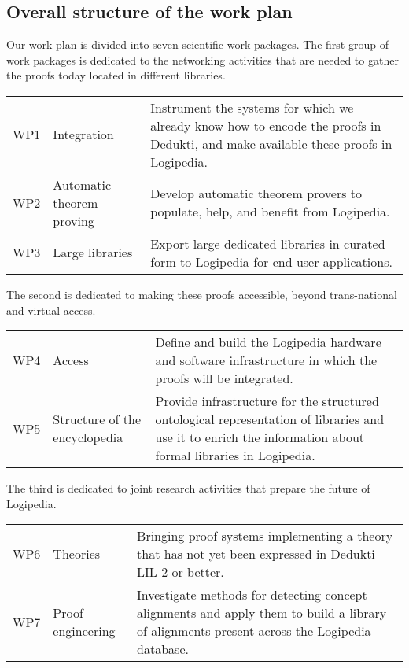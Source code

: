 \subsection{Overall structure of the work plan}

Our work plan is divided into seven scientific work packages.
The first group of work packages is dedicated to the networking
activities that are needed to gather the proofs today located in
different libraries.

\begin{longtable}{|p{}|p{}|p{}|}
\hline
\rowcolor{cyan}\multicolumn{3}{|l|}{\bf Networking activities:}\\
\hline
WP1
&
Integration
&
Instrument the systems for which we already know how to encode the
proofs in Dedukti, and make available these proofs in Logipedia.
\\
\hline
WP2
&
Automatic theorem proving
& 
Develop automatic theorem provers to populate,
help, and benefit from Logipedia.
\\
\hline
WP3
&
Large libraries
&
Export large dedicated libraries in curated form 
to Logipedia for end-user applications.
\\
\hline
\end{longtable}

The second is dedicated to making these proofs accessible, beyond
trans-national and virtual access.

\begin{longtable}{|p{}|p{}|p{}|}
\hline
\rowcolor{cyan}\multicolumn{3}{|l|}{\bf Trans-national and virtual access:}\\
\hline
WP4
&
Access
&
Define and build the Logipedia hardware and software infrastructure in
which the proofs will be integrated.
\\
\hline
WP5
&
Structure of the encyclopedia
&
Provide infrastructure for the structured ontological representation
of libraries and use it to enrich the information about formal
libraries in Logipedia.
\\
\hline
\end{longtable}

The third is dedicated to joint research activities that prepare
the future of Logipedia.

\begin{longtable}{|p{}|p{}|p{}|}
\hline
\rowcolor{cyan}\multicolumn{3}{|l|}{\bf Joint research activities:}\\
\hline
WP6
&
Theories
&
Bringing proof systems implementing a theory 
that has not yet been expressed in Dedukti LIL 2 or better.
\\
\hline
WP7
&
Proof engineering
&
Investigate methods for detecting concept alignments and apply
them to build a library of alignments present across the Logipedia database.
\\
\hline
\end{longtable}

